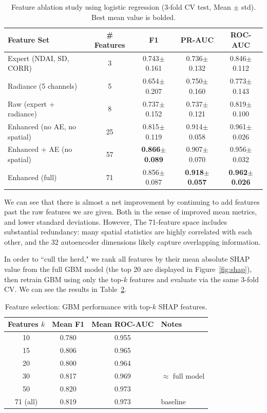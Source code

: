 \documentclass[11pt,letterpaper]{article}
\begin{document}
\begin{table}[H]
\centering
\begin{tabular}{lcccc}
\toprule
Feature Set & \# Features & F1 & PR-AUC & ROC-AUC \\
\midrule
Expert (NDAI, SD, CORR) & 3 & 0.743$\pm$0.161 & 0.736$\pm$0.132 & 0.846$\pm$0.112 \\
Radiance (5 channels) & 5 & 0.654$\pm$0.207 & 0.750$\pm$0.160 & 0.773$\pm$0.143 \\
Raw (expert + radiance) & 8 & 0.737$\pm$0.152 & 0.737$\pm$0.121 & 0.819$\pm$0.100 \\
Enhanced (no AE, no spatial) & 25 & 0.815$\pm$0.119 & 0.914$\pm$0.058 & 0.961$\pm$0.026 \\
Enhanced + AE (no spatial) & 57 & \textbf{0.866$\pm$0.089} & 0.907$\pm$0.070 & 0.956$\pm$0.032 \\
Enhanced (full) & 71 & 0.856$\pm$0.087 & \textbf{0.918$\pm$0.057} & \textbf{0.962$\pm$0.026} \\
\bottomrule
\end{tabular}
\caption{Feature ablation study using logistic regression (3-fold CV test, Mean $\pm$ std). Best mean value is bolded.}
\label{tab:ablation}
\end{table}

We can see that there is almost a net improvement by continuing to add features past the raw features we are given. Both in the sense of improved mean metrics, and lower standard deviations. However, The 71-feature space includes substantial redundancy: many spatial statistics are highly correlated with each other, and the 32 autoencoder dimensions likely capture overlapping information.

In order to ``cull the herd," we rank all features by their mean absolute SHAP value from the full GBM model (the top 20 are displayed in Figure~\ref{fig:shap}), then retrain GBM using only the top-$k$ features and evaluate via the same 3-fold CV. We can see the results in Table~\ref{tab:feat_select}.

\begin{table}[H]
\centering
\begin{tabular}{cccl}
\toprule
Features $k$ & Mean F1 & Mean ROC-AUC & Notes \\
\midrule
10 & 0.780 & 0.955 & \\
15 & 0.806 & 0.965 & \\
20 & 0.800 & 0.964 & \\
30 & 0.817 & 0.969 & $\approx$ full model \\
50 & 0.820 & 0.973 & \\
71 (all) & 0.819 & 0.973 & baseline \\
\bottomrule
\end{tabular}
\caption{Feature selection: GBM performance with top-$k$ SHAP features.}
\label{tab:feat_select}
\end{table}
\end{document}
